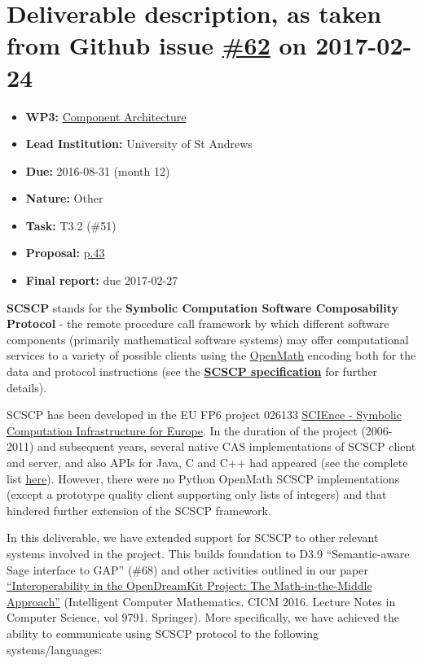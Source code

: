 \section*{\texorpdfstring{Deliverable description, as taken from Github
issue
\href{https://github.com/OpenDreamKit/OpenDreamKit/issues/62}{\#62} on
2017-02-24}{Deliverable description, as taken from Github issue \#62 on 2017-02-24}}\label{deliverable-description-as-taken-from-github-issue-62-on-2017-02-24}
\begin{itemize}
\tightlist
\item
  \textbf{WP3:}
  \href{https://github.com/OpenDreamKit/OpenDreamKit/tree/master/WP3}{Component
  Architecture}
\item
  \textbf{Lead Institution:} University of St Andrews
\item
  \textbf{Due:} 2016-08-31 (month 12)
\item
  \textbf{Nature:} Other
\item
  \textbf{Task:} T3.2 (\#51)
\item
  \textbf{Proposal:}
  \href{https://github.com/OpenDreamKit/OpenDreamKit/raw/master/Proposal/proposal-www.pdf}{p.43}
\item
  \textbf{Final report:} due 2017-02-27
\end{itemize}

\textbf{SCSCP} stands for the \textbf{Symbolic Computation Software
Composability Protocol} - the remote procedure call framework by which
different software components (primarily mathematical software systems)
may offer computational services to a variety of possible clients using
the \href{http://www.openmath.org/}{OpenMath} encoding both for the data
and protocol instructions (see the
\href{http://www.symbolic-computing.org/scscp}{\textbf{SCSCP
specification}} for further details).

SCSCP has been developed in the EU FP6 project 026133
\href{http://www.symbolic-computing.org/}{SCIEnce - Symbolic Computation
Infrastructure for Europe}. In the duration of the project (2006-2011)
and subsequent years, several native CAS implementations of SCSCP client
and server, and also APIs for Java, C and C++ had appeared (see the
complete list \href{http://www.symbolic-computing.org/}{here}). However,
there were no Python OpenMath SCSCP implementations (except a prototype
quality client supporting only lists of integers) and that hindered
further extension of the SCSCP framework.

In this deliverable, we have extended support for SCSCP to other
relevant systems involved in the project. This builds foundation to D3.9
``Semantic-aware Sage interface to GAP'' (\#68) and other activities
outlined in our paper
\href{https://dx.doi.org/10.1007/978-3-319-42547-4_9}{``Interoperability
in the OpenDreamKit Project: The Math-in-the-Middle Approach''}
(Intelligent Computer Mathematics. CICM 2016. Lecture Notes in Computer
Science, vol 9791. Springer). More specifically, we have achieved the
ability to communicate using SCSCP protocol to the following
systems/languages: 

